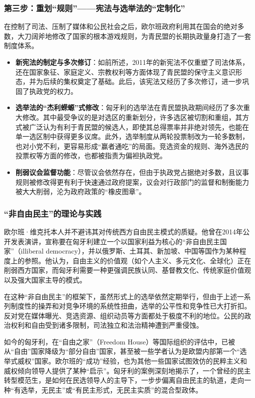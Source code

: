 \documentclass[UTF8, 10pt]{ctexbook}
\begin{document}
\subsubsection{第三步：重划“规则”——宪法与选举法的“定制化”}
在控制了司法、压制了媒体和公民社会之后，欧尔班政府利用其在国会的绝对多数，大刀阔斧地修改了国家的根本游戏规则，为青民盟的长期执政量身打造了一套制度体系。
\begin{itemize}
    \item \textbf{新宪法的制定与多次修订}：如前所述，2011年的新宪法不仅重塑了司法体系，还在国家象征、家庭定义、宗教权利等方面体现了青民盟的保守主义意识形态，并为后续的集权奠定了基础。此后，该宪法又经历了多次修订，进一步巩固了执政党的权力。
    \item \textbf{选举法的“杰利蝾螈”式修改}：匈牙利的选举法在青民盟执政期间经历了多次重大修改。其中最受争议的是对选区的重新划分，许多选区被切割和重组，其方式被广泛认为有利于青民盟的候选人，即使其总得票率并非绝对领先，也能在单一选区制中获得更多议席。此外，选举制度从两轮投票制改为一轮多数制，也对小党不利，更容易形成“赢者通吃”的局面。竞选资金的规则、海外选民的投票权等方面的修改，也都被指责为偏袒执政党。
    \item \textbf{削弱议会监督功能}：尽管议会依然存在，但由于执政党占据绝对多数，且议事规则被修改得更有利于快速通过政府提案，议会对行政部门的监督和制衡能力被大大削弱，沦为政府政策的“橡皮图章”。
\end{itemize}
\subsubsection{“非自由民主”的理论与实践}
欧尔班·维克托本人并不避讳其对传统西方自由民主模式的质疑。他曾在2014年公开发表演讲，宣称要在匈牙利建立一个以国家利益为核心的“非自由民主国家”（illiberal democracy），并以俄罗斯、土耳其、新加坡、中国等国作为某种程度上的参照。他认为，自由主义的价值观（如个人主义、多元文化、全球化）正在削弱西方国家，而匈牙利需要一种更强调民族认同、基督教文化、传统家庭价值观以及强大国家主导的模式。

在这种“非自由民主”的框架下，虽然形式上的选举依然定期举行，但由于上述一系列制度性的操弄和对竞争环境的系统性扭曲，选举的公平性和竞争性已大打折扣。反对党在媒体曝光、竞选资源、组织动员等方面都处于极度不利的地位。公民的政治权利和自由受到诸多限制，司法独立和法治精神遭到严重侵蚀。

如今的匈牙利，在“自由之家”（Freedom House）等国际组织的评估中，已被从“自由”国家降级为“部分自由”国家，甚至被一些学者认为是欧盟内部第一个“选举式威权”国家。欧尔班的“成功”经验，也为其他一些国家试图效仿的民粹主义和威权倾向领导人提供了某种“启示”。匈牙利的案例深刻地揭示了，一个曾经的民主转型模范生，是如何在民选领导人的主导下，一步步偏离自由民主的轨道，走向一种“有选举，无民主”或“有民主形式，无民主实质”的混合型政体。
\end{document}
